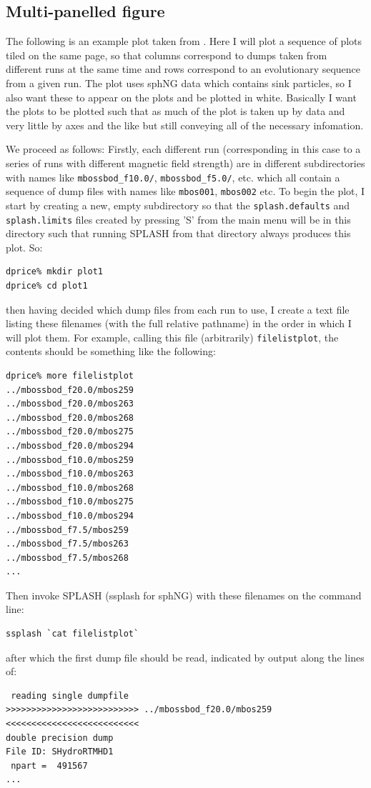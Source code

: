 \documentclass[a4paper,10pt]{article}
\newcommand{\splash}{\textsc{SPLASH }}
\begin{document}
\subsection{Multi-panelled figure}
 The following is an example plot taken from \citet{pb07}. Here I will plot a sequence of plots tiled on the same page, so that columns correspond to dumps taken from different runs at the same time and rows correspond to an evolutionary sequence from a given run. The plot uses sphNG data which contains sink particles, so I also want these to appear on the plots and be plotted in white. Basically I want the plots to be plotted such that as much of the plot is taken up by data and very little by axes and the like but still conveying all of the necessary infomation.
 
 We proceed as follows: Firstly, each different run (corresponding in this case to a series of runs with different magnetic field strength) are in different subdirectories with names like \verb+mbossbod_f10.0/+, \verb+mbossbod_f5.0/+, etc. which all contain a sequence of dump files with names like \verb+mbos001+, \verb+mbos002+ etc. To begin the plot, I start by creating a new, empty subdirectory so that the \verb+splash.defaults+ and \verb+splash.limits+ files created by pressing 'S' from the main menu will be in this directory such that running \splash from that directory always produces this plot. So:
\begin{verbatim}
dprice% mkdir plot1
dprice% cd plot1
\end{verbatim}
then having decided which dump files from each run to use, I create a text file listing these filenames (with the full relative pathname) in the order in which I will plot them. For example, calling this file (arbitrarily) \verb+filelistplot+, the contents should be something like the following:
\begin{verbatim}
dprice% more filelistplot 
../mbossbod_f20.0/mbos259
../mbossbod_f20.0/mbos263
../mbossbod_f20.0/mbos268
../mbossbod_f20.0/mbos275
../mbossbod_f20.0/mbos294
../mbossbod_f10.0/mbos259
../mbossbod_f10.0/mbos263
../mbossbod_f10.0/mbos268
../mbossbod_f10.0/mbos275
../mbossbod_f10.0/mbos294
../mbossbod_f7.5/mbos259
../mbossbod_f7.5/mbos263
../mbossbod_f7.5/mbos268
...
\end{verbatim}
 Then invoke \splash (ssplash for sphNG) with these filenames on the command line:
\begin{verbatim}
ssplash `cat filelistplot`
\end{verbatim}
after which the first dump file should be read, indicated by output along the lines of:
\begin{verbatim}
 reading single dumpfile
>>>>>>>>>>>>>>>>>>>>>>>>>> ../mbossbod_f20.0/mbos259 <<<<<<<<<<<<<<<<<<<<<<<<<<
double precision dump
File ID: SHydroRTMHD1
 npart =  491567
...
\end{verbatim}
\end{document}
